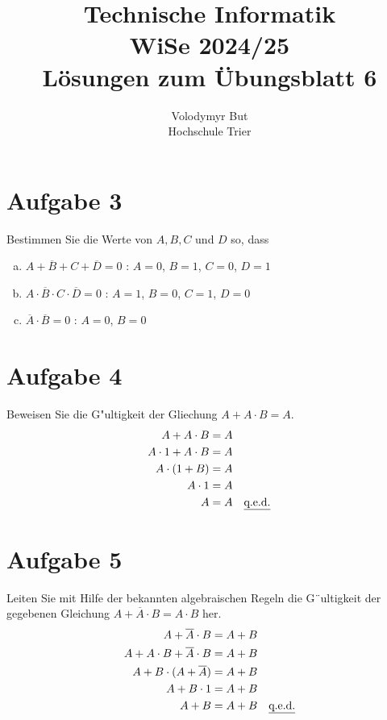 \documentclass[10pt, oneside]{article}
\title{Technische Informatik\\[10pt]\Large{WiSe 2024/25}\\[15pt]\Large{L{\"o}sungen zum {\"U}bungsblatt 6}}
\author{Volodymyr But\\[10pt]Hochschule Trier}
\date{}
\begin{document}
\maketitle
\vspace{25px}

\setcounter{section}{2}
\section{Aufgabe 3}

Bestimmen Sie die Werte von $A, B, C$ und $D$ so, dass
\begin{enumerate}[(a)]
    \item $A + \overline{B} + C + \overline{D} = 0$ : $A = 0$, $B = 1$, $C = 0$, $D = 1$
    \item $A \cdot \overline{B} \cdot C \cdot \overline{D} = 0$ : $A = 1$, $B = 0$, $C = 1$, $D = 0$
    \item $\overline{A} \cdot \overline{B} = 0$ : $A = 0$, $B = 0$
\end{enumerate}

\section{Aufgabe 4}

Beweisen Sie die G"ultigkeit der Gliechung $A + A \cdot B = A$.
\begin{align*}
    A + A \cdot B &= A \\
    A \cdot 1 + A \cdot B &= A \\
    A \cdot (1 + B) &= A \\
    A \cdot 1 &= A \\
    A &= A \quad \text{\underline{q.e.d.}}
\end{align*}

\section{Aufgabe 5}

Leiten Sie mit Hilfe der bekannten algebraischen Regeln die G¨ultigkeit der gegebenen
Gleichung $A + \overline{A} \cdot B = A \cdot B$ her.
\begin{align*}
    A + \overline{A} \cdot B &= A + B \\
    A + A \cdot B + \overline{A} \cdot B &= A + B \\
    A + B \cdot (A + \overline{A}) &= A + B \\
    A + B \cdot 1 &= A + B \\
    A + B &= A + B \quad \text{\underline{q.e.d.}}
\end{align*}
\end{document}
